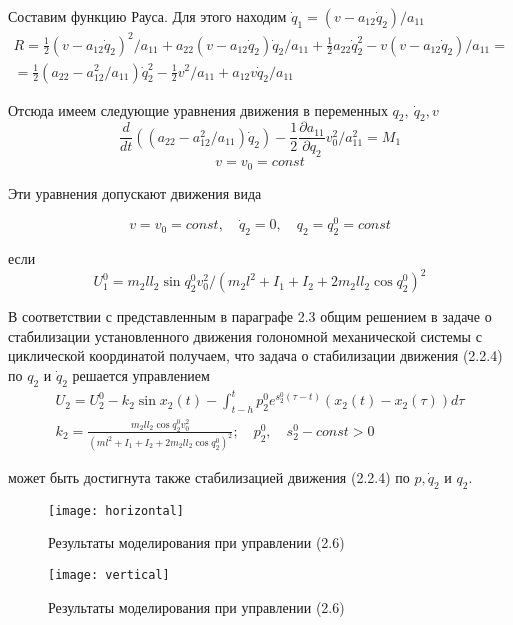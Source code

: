 Составим функцию Рауса. Для этого находим $\dot q_1 = (v - a_12 \dot q_2) / a_{11}$
$$
\begin{array}{c}
\displaystyle R = \frac12 (v - a_{12} \dot q_2)^2 / a_{11} + a_{22} (v - a_{12} \dot q_2) \dot q_2 / a_{11} + \frac12 a_{22} \dot q_2^2 - v (v - a_{12} \dot q_2) / a_{11} =\\
\displaystyle = \frac12 (a_{22} - a_{12}^2 / a_{11}) \dot q_2^2 - \frac12 v^2 / a_{11} + a_{12} v \dot q_2 / a_{11}
\end{array}
$$

Отсюда имеем следующие уравнения движения в переменных $q_2, \ \dot q_2, v$
$$\frac{d}{dt} ((a_{22} - a_{12}^2 / a_{11}) \dot q_2) - \frac12 \frac{\partial a_{11}}{\partial q_2} v_0^2 / a_{11}^2 = M_1$$
$$v = v_0 = const$$

Эти уравнения допускают движения вида 

\begin{equation}
v = v_0 = const, \quad \dot q_2 = 0, \quad q_2 = q_2^0 = const
\end{equation}

если 
$$U_1^0 = m_2 l l_2 \sin q_2^0 v_0^2 / (m_2 l^2 + I_1 + I_2 + 2 m_2 l l_2 \cos q_2^0)^2$$

В соответствии с представленным в параграфе 2.3 общим решением в задаче о стабилизации установленного движения голономной механической системы с циклической координатой получаем, что задача о стабилизации движения (2.2.4) по $q_2$ и $\dot q_2$ решается управлением
$$
\begin{array}{c}
\displaystyle U_2 = U_2^0 - k_2 \sin x_2 (t) - \int_{t-h}^{t} p_2^0 e^{s_2^0 (\tau - t)} (x_2 (t) - x_2 (\tau)) d \tau\\
\displaystyle k_2 = \frac{m_2 l l_2 \cos q_2^0 v_0^2}{(m l^2 + I_1 + I_2 + 2 m_2 l l_2 \cos q_2^0)^2}; \quad p_2^0, \quad s_2^0 - const > 0
\end{array}
$$

может быть достигнута также стабилизацией движения (2.2.4) по $p, \dot q_2$ и $q_2.$

\begin{figure}[h]
	\centering
	\texttt{[image: horizontal]}
	\caption{Результаты моделирования при управлении (2.6)}
	\label{fig:manip_horizontal}
\end{figure}

\begin{figure}[h]
	\centering
	\texttt{[image: vertical]}
	\caption{Результаты моделирования при управлении (2.6)}
	\label{fig:manip_vertical}
\end{figure}

